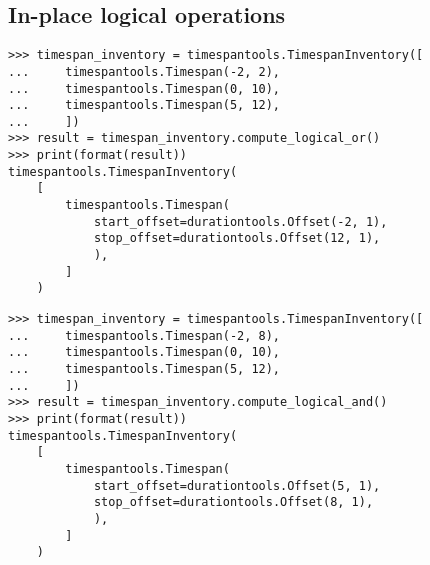 \subsection{In-place logical operations} %

\begin{comment}
<abjad>
timespan_inventory = timespantools.TimespanInventory([
    timespantools.Timespan(-2, 2),
    timespantools.Timespan(0, 10),
    timespantools.Timespan(5, 12),
    ])
result = timespan_inventory.compute_logical_or()
print(format(result))
</abjad>
\end{comment}

\begin{singlespacing}
\vspace{-0.5\baselineskip}
\begin{lstlisting}
>>> timespan_inventory = timespantools.TimespanInventory([
...     timespantools.Timespan(-2, 2),
...     timespantools.Timespan(0, 10),
...     timespantools.Timespan(5, 12),
...     ])
>>> result = timespan_inventory.compute_logical_or()
>>> print(format(result))
timespantools.TimespanInventory(
    [
        timespantools.Timespan(
            start_offset=durationtools.Offset(-2, 1),
            stop_offset=durationtools.Offset(12, 1),
            ),
        ]
    )
\end{lstlisting}
\end{singlespacing}

\begin{comment}
<abjad>
timespan_inventory = timespantools.TimespanInventory([
    timespantools.Timespan(-2, 8),
    timespantools.Timespan(0, 10),
    timespantools.Timespan(5, 12),
    ])
result = timespan_inventory.compute_logical_and()
print(format(result))
</abjad>
\end{comment}

\begin{singlespacing}
\vspace{-0.5\baselineskip}
\begin{lstlisting}
>>> timespan_inventory = timespantools.TimespanInventory([
...     timespantools.Timespan(-2, 8),
...     timespantools.Timespan(0, 10),
...     timespantools.Timespan(5, 12),
...     ])
>>> result = timespan_inventory.compute_logical_and()
>>> print(format(result))
timespantools.TimespanInventory(
    [
        timespantools.Timespan(
            start_offset=durationtools.Offset(5, 1),
            stop_offset=durationtools.Offset(8, 1),
            ),
        ]
    )
\end{lstlisting}
\end{singlespacing}

